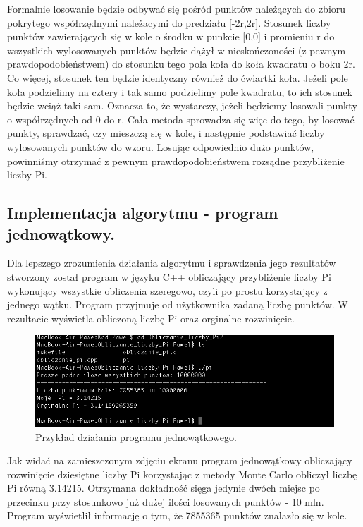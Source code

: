 \documentclass[a4paper,12pt]{article}		%
\begin{document}
 Formalnie losowanie będzie odbywać się pośród punktów należących do zbioru pokrytego współrzędnymi należacymi do predziału [-2r,2r]. Stosunek liczby punktów
zawierających się w kole o środku w punkcie [0,0] i promieniu r do wszystkich wylosowanych punktów będzie dążył w nieskończoności (z pewnym prawdopodobieństwem) do stosunku tego pola koła do koła kwadratu o boku 2r. Co więcej, stosunek ten będzie identyczny również do ćwiartki koła. Jeżeli pole koła podzielimy na cztery i tak samo podzielimy pole kwadratu, to ich stosunek będzie wciąż taki sam. Oznacza to, że wystarczy, jeżeli będziemy losowali punkty o współrzędnych od 0 do r. Cała metoda sprowadza się więc do tego, by losować punkty, sprawdzać, czy mieszczą się w kole, i następnie podstawiać liczby wylosowanych punktów do wzoru. Losując odpowiednio dużo punktów, powinniśmy otrzymać z pewnym prawdopodobieństwem rozsądne przybliżenie liczby Pi.

\subsection{Implementacja algorytmu - program jednowątkowy.} 
Dla lepszego zrozumienia działania algorytmu i sprawdzenia jego rezultatów stworzony został program w języku C++ obliczający przybliżenie liczby Pi wykonujący wszystkie obliczenia szeregowo, czyli po prostu korzystający z jednego wątku. Program przyjmuje od użytkownika zadaną liczbę punktów. W rezultacie wyświetla obliczoną liczbę Pi oraz orginalne rozwinięcie.



\begin{figure}[h!]
\centering
\includegraphics[scale=0.6]{Resources/Screen_Program_JedenWatek}
\caption{Przykład działania programu jednowątkowego.} 
\end{figure}

Jak widać na zamieszczonym zdjęciu ekranu program jednowątkowy obliczający rozwinięcie dziesiętne liczby Pi korzystając z metody Monte Carlo obliczył liczbę Pi równą 3.14215. Otrzymana dokładność sięga jedynie dwóch miejsc po przecinku przy stosunkowo już dużej ilości losowanych punktów - 10 mln. Program wyświetlił informację o tym, że 7855365 punktów znalazło się w kole.
\newpage
\end{document}
